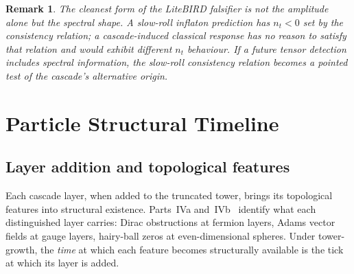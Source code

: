 \documentclass[12pt,a4paper]{article}
\newtheorem*{remark}{Remark}
\begin{document}
\begin{remark}
The cleanest form of the LiteBIRD falsifier is not the amplitude alone but
the \emph{spectral shape}. A slow-roll inflaton prediction has $n_t < 0$ set
by the consistency relation; a cascade-induced classical response has no
reason to satisfy that relation and would exhibit different $n_t$ behaviour.
If a future tensor detection includes spectral information, the slow-roll
consistency relation becomes a pointed test of the cascade's alternative
origin.
\end{remark}

\section{Particle Structural Timeline}
\label{sec:particles}

\subsection{Layer addition and topological features}

Each cascade layer, when added to the truncated tower, brings its topological
features into structural existence. Parts~IVa and~IVb~\cite{part4a,part4b}
identify what each distinguished layer carries: Dirac obstructions at fermion
layers, Adams vector fields at gauge layers, hairy-ball zeros at
even-dimensional spheres. Under tower-growth, the \emph{time} at which each
feature becomes structurally available is the tick at which its layer is added.

\begin{center}
\renewcommand{\arraystretch}{1.25}
\end{center}
\end{document}
